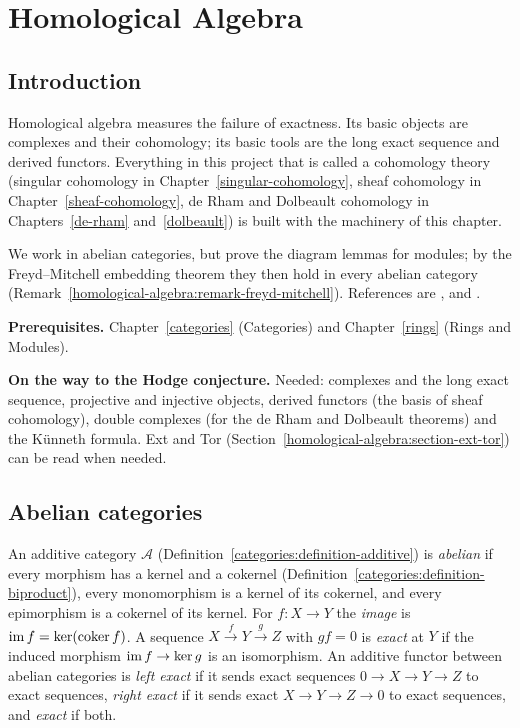 \chapter{Homological Algebra}\label{homological-algebra}

\section{Introduction}\label{homological-algebra:section-introduction}

Homological algebra measures the failure of exactness. Its basic objects are complexes and their
cohomology; its basic tools are the long exact sequence and derived functors. Everything in this project
that is called a cohomology theory (singular cohomology in Chapter~\ref{singular-cohomology}, sheaf
cohomology in Chapter~\ref{sheaf-cohomology}, de Rham and Dolbeault cohomology in
Chapters~\ref{de-rham} and~\ref{dolbeault}) is built with the machinery of this chapter.

We work in abelian categories, but prove the diagram lemmas for modules; by the Freyd--Mitchell embedding
theorem they then hold in every abelian category (Remark~\ref{homological-algebra:remark-freyd-mitchell}).
References are \cite{weibel-homological}, \cite{cartan-eilenberg} and \cite{gelfand-manin}.

\noindent\textbf{Prerequisites.} Chapter~\ref{categories} (Categories) and Chapter~\ref{rings} (Rings and
Modules).

\noindent\textbf{On the way to the Hodge conjecture.} Needed: complexes and the long exact sequence, projective and injective objects, derived functors (the basis of sheaf cohomology), double
complexes (for the de Rham and Dolbeault theorems) and the K\"unneth formula. Ext and Tor (Section~\ref{homological-algebra:section-ext-tor}) can be read when needed.

\section{Abelian categories}\label{homological-algebra:section-abelian}

\begin{definition}\label{homological-algebra:definition-abelian}
An additive category $\mathcal{A}$ (Definition~\ref{categories:definition-additive}) is \emph{abelian} if every
morphism has a kernel and a cokernel (Definition~\ref{categories:definition-biproduct}), every monomorphism is a
kernel of its cokernel, and every epimorphism is a cokernel of its kernel. For $f \colon X \to Y$ the \emph{image} is
$\operatorname{im} f = \ker(\operatorname{coker} f)$. A sequence $X \xrightarrow{f} Y \xrightarrow{g} Z$ with $gf = 0$ is \emph{exact} at $Y$ if the
induced morphism $\operatorname{im} f \to \ker g$ is an isomorphism. An additive functor between abelian categories is
\emph{left exact} if it sends exact sequences $0 \to X \to Y \to Z$ to exact sequences, \emph{right exact} if it sends
exact $X \to Y \to Z \to 0$ to exact sequences, and \emph{exact} if both.
\end{definition}

